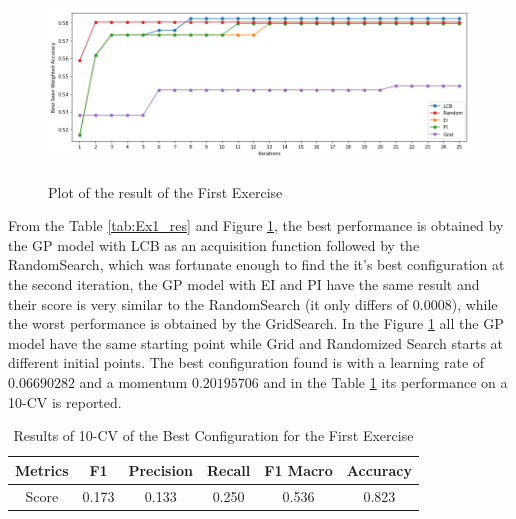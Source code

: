 \documentclass[12pt, onecolumn]{article}
\begin{document}
\begin{figure}[!h]
  \centering
  \includegraphics[width=\linewidth, height=5cm]{imgs/first.png}
  \caption{Plot of the result of the First Exercise}
  \label{fig:first}
\end{figure}
From the Table \ref{tab:Ex1_res} and Figure \ref{fig:first}, the best performance is obtained by the GP model with LCB as an acquisition function followed by the RandomSearch, which was fortunate enough to find the it's best configuration at the second iteration, the GP model with EI and PI have the same result and their score is very similar to the RandomSearch (it only differs of $0.0008$), while the worst performance is obtained by the GridSearch.
In the Figure \ref{fig:first} all the GP model have the same starting point while Grid and Randomized Search starts at different initial points.
The best configuration found is with a learning rate of $0.06690282$ and a momentum $0.20195706$ and in the Table \ref{tab:best_1} its performance on a 10-CV is reported.
\begin{table}[!h]
  \centering
  \begin{tabular}{ |c|c|c|c|c|c| } 
    \hline
    Metrics& F1 & Precision & Recall & F1 Macro & Accuracy\\
    \hline
    Score& 0.173 & 0.133 & 0.250 & 0.536 & 0.823\\
    \hline
  \end{tabular}
  \caption{Results of 10-CV of the Best Configuration for the First Exercise}
  \label{tab:best_1}
\end{table}
\end{document}
